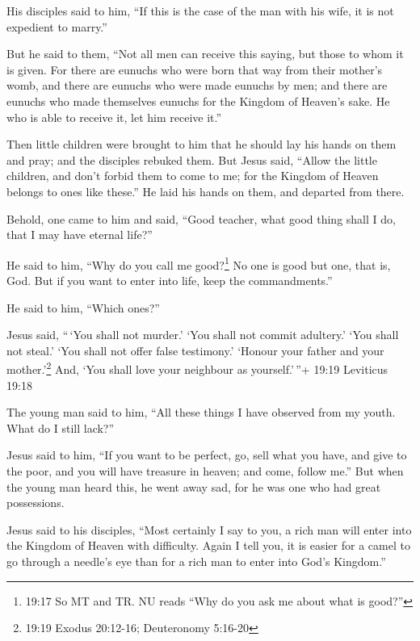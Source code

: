  His disciples said to him, ``If this is the case of the
man with his wife, it is not expedient to marry.''

 But he said to them, ``Not all men can receive this
saying, but those to whom it is given.  For there are
eunuchs who were born that way from their mother's womb, and there are
eunuchs who were made eunuchs by men; and there are eunuchs who made
themselves eunuchs for the Kingdom of Heaven's sake. He who is able to
receive it, let him receive it.''

 Then little children were brought to him that he should
lay his hands on them and pray; and the disciples rebuked them.
 But Jesus said, ``Allow the little children, and don't
forbid them to come to me; for the Kingdom of Heaven belongs to ones
like these.''  He laid his hands on them, and departed from
there.

 Behold, one came to him and said, ``Good teacher, what
good thing shall I do, that I may have eternal life?''

 He said to him, ``Why do you call me good?\footnote{19:17
  So MT and TR. NU reads ``Why do you ask me about what is good?''} No
one is good but one, that is, God. But if you want to enter into life,
keep the commandments.''

 He said to him, ``Which ones?''

Jesus said, ``\,`You shall not murder.' `You shall not commit adultery.'
`You shall not steal.' `You shall not offer false testimony.'
 `Honour your father and your mother.'\footnote{19:19
  Exodus 20:12-16; Deuteronomy 5:16-20} And, `You shall love your
neighbour as yourself.'\,''+ 19:19 Leviticus 19:18

 The young man said to him, ``All these things I have
observed from my youth. What do I still lack?''

 Jesus said to him, ``If you want to be perfect, go, sell
what you have, and give to the poor, and you will have treasure in
heaven; and come, follow me.''  But when the young man
heard this, he went away sad, for he was one who had great possessions.

 Jesus said to his disciples, ``Most certainly I say to
you, a rich man will enter into the Kingdom of Heaven with difficulty.
 Again I tell you, it is easier for a camel to go through a
needle's eye than for a rich man to enter into God's Kingdom.''

